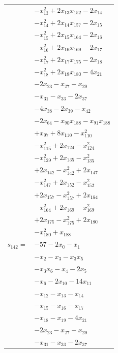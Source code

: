 \begin{longtable}{@{}r@{\;}l@{}}
 & \(\displaystyle -x_{13}^{2} +2x_{13}x_{152} -2x_{14}\) \\
 & \(\displaystyle -x_{14}^{2} +2x_{14}x_{157} -2x_{15}\) \\
 & \(\displaystyle -x_{15}^{2} +2x_{15}x_{164} -2x_{16}\) \\
 & \(\displaystyle -x_{16}^{2} +2x_{16}x_{169} -2x_{17}\) \\
 & \(\displaystyle -x_{17}^{2} +2x_{17}x_{175} -2x_{18}\) \\
 & \(\displaystyle -x_{18}^{2} +2x_{18}x_{180} -4x_{21}\) \\
 & \(\displaystyle -2x_{23} -x_{27} -x_{29}\) \\
 & \(\displaystyle -x_{31} -x_{33} -2x_{37}\) \\
 & \(\displaystyle -4x_{38} -2x_{39} -x_{42}\) \\
 & \(\displaystyle -2x_{64} -x_{90}x_{188} -x_{91}x_{188}\) \\
 & \(\displaystyle +x_{97} +8x_{110} -x_{110}^{2}\) \\
 & \(\displaystyle -x_{115}^{2} +2x_{124} -x_{124}^{2}\) \\
 & \(\displaystyle -x_{129}^{2} +2x_{135} -x_{135}^{2}\) \\
 & \(\displaystyle +2x_{142} -x_{142}^{2} +2x_{147}\) \\
 & \(\displaystyle -x_{147}^{2} +2x_{152} -x_{152}^{2}\) \\
 & \(\displaystyle +2x_{157} -x_{157}^{2} +2x_{164}\) \\
 & \(\displaystyle -x_{164}^{2} +2x_{169} -x_{169}^{2}\) \\
 & \(\displaystyle +2x_{175} -x_{175}^{2} +2x_{180}\) \\
 & \(\displaystyle -x_{180}^{2} +x_{188}\) \\[3pt]
\(s_{142}=\) & \(\displaystyle -57 -2x_{0} -x_{1}\) \\
 & \(\displaystyle -x_{2} -x_{3} -x_{3}x_{5}\) \\
 & \(\displaystyle -x_{3}x_{6} -x_{4} -2x_{5}\) \\
 & \(\displaystyle -x_{6} -2x_{10} -14x_{11}\) \\
 & \(\displaystyle -x_{12} -x_{13} -x_{14}\) \\
 & \(\displaystyle -x_{15} -x_{16} -x_{17}\) \\
 & \(\displaystyle -x_{18} -x_{19} -4x_{21}\) \\
 & \(\displaystyle -2x_{23} -x_{27} -x_{29}\) \\
 & \(\displaystyle -x_{31} -x_{33} -2x_{37}\) \\

\end{longtable}
